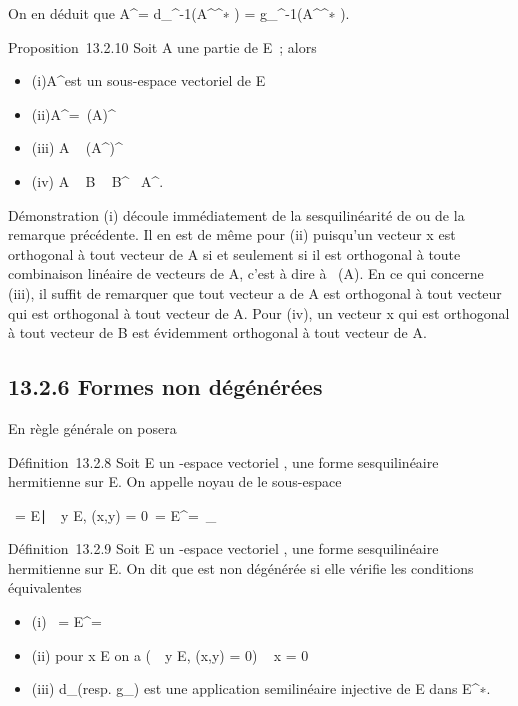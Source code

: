 \documentclass[]{article}
\begin{document}
On en déduit que A^\bot =
d_\phi^-1(A^\bot^∗ ) =
g_\phi^-1(A^\bot^∗ ).

Proposition~13.2.10 Soit A une partie de E~; alors

\begin{itemize}
\itemsep1pt\parskip0pt
\item
  (i)A^\bot est un sous-espace vectoriel de E
\item
  (ii)A^\bot =\
  \mathrmVect(A)^\bot
\item
  (iii) A \subset~ (A^\bot)^\bot
\item
  (iv) A \subset~ B \rigtharrow~ B^\bot\subset~ A^\bot.
\end{itemize}

Démonstration (i) découle immédiatement de la sesquilinéarité de \phi ou de
la remarque précédente. Il en est de même pour (ii) puisqu'un vecteur x
est orthogonal à tout vecteur de A si et seulement si il est orthogonal
à toute combinaison linéaire de vecteurs de A, c'est à dire à
\mathrmVect~(A). En ce qui
concerne (iii), il suffit de remarquer que tout vecteur a de A est
orthogonal à tout vecteur qui est orthogonal à tout vecteur de A. Pour
(iv), un vecteur x qui est orthogonal à tout vecteur de B est évidemment
orthogonal à tout vecteur de A.

\subsection{13.2.6 Formes non dégénérées}

En règle générale on posera

Définition~13.2.8 Soit E un -espace vectoriel , \phi une forme
sesquilinéaire hermitienne sur E. On appelle noyau de \phi le sous-espace

\mathrmKer~\phi =
\x \in
E∣\forall~~y \in E, \phi(x,y) =
0\ = E^\bot =\
\mathrmKerd_ \phi

Définition~13.2.9 Soit E un -espace vectoriel , \phi une forme
sesquilinéaire hermitienne sur E. On dit que \phi est non dégénérée si elle
vérifie les conditions équivalentes

\begin{itemize}
\itemsep1pt\parskip0pt
\item
  (i) \mathrmKer~\phi =
  E^\bot = \0\
\item
  (ii) pour x \in E on a \left
  (\forall~~y \in E, \phi(x,y) = 0\right ) \rigtharrow~
  x = 0
\item
  (iii) d_\phi (resp. g_\phi) est une application
  semilinéaire injective de E dans E^∗.
\end{itemize}
\end{document}
